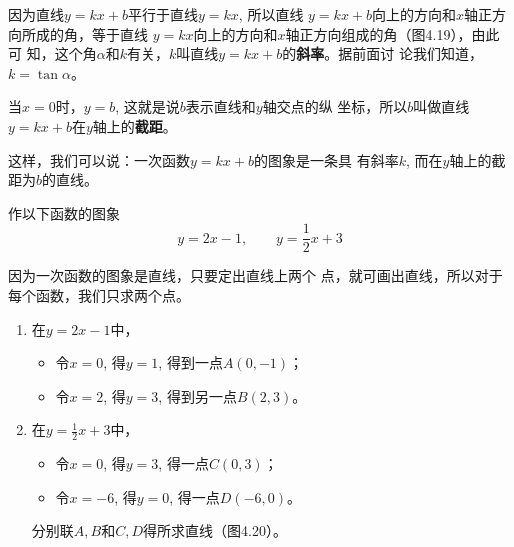 因为直线$y=kx+b$平行于直线$y=kx$, 所以直线
$y=kx+b$向上的方向和$x$轴正方向所成的角，等于直线
$y=kx$向上的方向和$x$轴正方向组成的角（图4.19），由此可
知，这个角$\alpha$和$k$有关，$k$叫直线$y=kx+b$的\textbf{斜率}。据前面讨
论我们知道，$k=\tan \alpha$。

当$x=0$时，$y=b$, 这就是说$b$表示直线和$y$轴交点的纵
坐标，所以$b$叫做直线$y=kx+b$在$y$轴上的\textbf{截距}。

这样，我们可以说：一次函数$y=kx+b$的图象是一条具
有斜率$k$, 而在$y$轴上的截距为$b$的直线。

\begin{example}
作以下函数的图象
\[y=2x-1,\qquad y=\dfrac{1}{2}x+3\]
\end{example}

\begin{solution}
因为一次函数的图象是直线，只要定出直线上两个
点，就可画出直线，所以对于每个函数，我们只求两个点。
\begin{enumerate}
    \item 在$y=2x-1$中，
    \begin{itemize}
        \item 令$x=0$, 得$y=1$, 得到一点$A(0,-1)$；
        \item 令$x=2$, 得$y=3$, 得到另一点$B(2,3)$。
    \end{itemize}
    \item 在$y=\frac{1}{2}x+3$中，
\begin{itemize}
    \item 令$x=0$, 得$y=3$, 得一点$C(0,3)$；
    \item 令$x=-6$, 得$y=0$, 得一点$D(-6,0)$。
\end{itemize}
分别联$A,B$和$C,D$得所求直线（图4.20）。
\end{enumerate}

\begin{figure}[htp]
    \centering
{}    
    \caption{}
\end{figure}
\end{solution}


